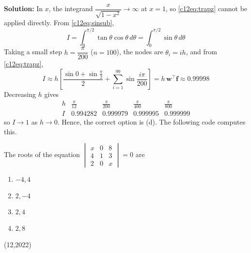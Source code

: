\textbf{Solution:} In $x$, the integrand $\dfrac{x}{\sqrt{1-x^2}} \to \infty$ at $x=1$, so \eqref{c12eq:trapz} cannot be applied directly. From \eqref{c12eq:sinsub},
\begin{equation}
I = \int_0^{\pi/2} \tan\theta\cos\theta\,d\theta = \int_0^{\pi/2} \sin\theta\,d\theta
\end{equation}
Taking a small step $h = \dfrac{\pi}{200}$ ($n = 100$), the nodes are $\theta_i = ih$, and from \eqref{c12eq:trapz},
\begin{equation}
I \approx h\left[\frac{\sin 0 + \sin\frac{\pi}{2}}{2} + \sum_{i=1}^{99} \sin\frac{i\pi}{200}\right]
= h\,\mathbf{w}^{\top}\mathbf{f} \approx 0.99998
\end{equation}
Decreasing $h$ gives
\begin{equation}
\begin{array}{c|cccc}
h & \frac{\pi}{12} & \frac{\pi}{200} & \frac{\pi}{400} & \frac{\pi}{800} \\ \hline
I & 0.994282 & 0.999979 & 0.999995 & 0.999999
\end{array}
\end{equation}
so $I \to 1$ as $h \to 0$. Hence, the correct option is (d). The following code computes this.

\nopagebreak[4]
\begin{center}
\end{center}

\item The roots of the equation $\begin{vmatrix} x & 0 & 8 \\ 4 & 1 & 3 \\ 2 & 0 & x \end{vmatrix} = 0$ are
\begin{enumerate}[label=(\alph*), noitemsep]
\item $-4, 4$
\item $2, -4$
\item $2, 4$
\item $2, 8$
\end{enumerate}
\hfill (12,2022)

